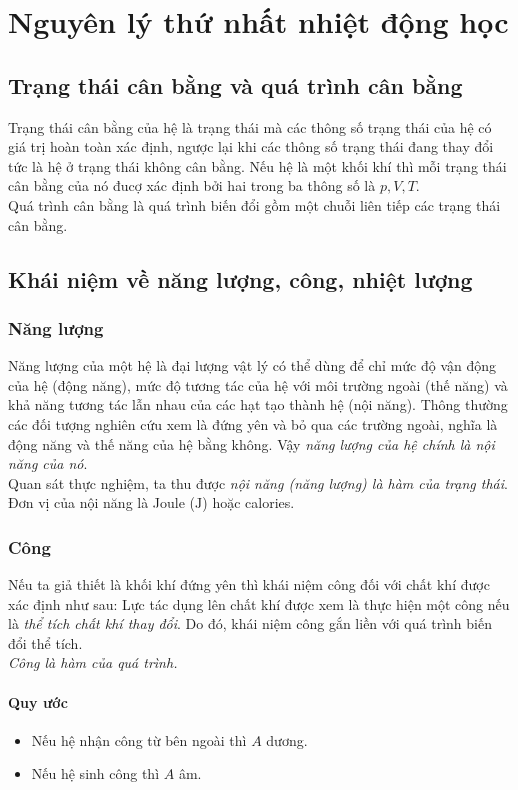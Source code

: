 \chapter{Nguyên lý thứ nhất nhiệt động học}
\section{Trạng thái cân bằng và quá trình cân bằng}
Trạng thái cân bằng của hệ là trạng thái mà các thông số trạng thái của hệ có giá trị hoàn toàn xác định, ngược lại khi các thông số trạng thái đang thay đổi tức là hệ ở trạng thái không cân bằng. Nếu hệ là một khối khí thì mỗi trạng thái cân bằng của nó đucợ xác định bởi hai trong ba thông số là $p, V, T.$\\
Quá trình cân bằng là quá trình biến đổi gồm một chuỗi liên tiếp các trạng thái cân bằng.
\section{Khái niệm về năng lượng, công, nhiệt lượng}
\subsection{Năng lượng}
Năng lượng của một hệ là đại lượng vật lý có thể dùng để chỉ mức độ vận động của hệ (động năng), mức độ tương tác của hệ với môi trường ngoài (thế năng) và khả năng tương tác lẫn nhau của các hạt tạo thành hệ (nội năng). Thông thường các đối tượng nghiên cứu xem là đứng yên và bỏ qua các trường ngoài, nghĩa là động năng và thế năng của hệ bằng không. Vậy \textit{năng lượng của hệ chính là nội năng của nó}.\\
Quan sát thực nghiệm, ta thu được \textit{nội năng (năng lượng) là hàm của trạng thái}.
Đơn vị của nội năng là Joule ($\mathrm{J}$) hoặc calories. 
\subsection{Công}
Nếu ta giả thiết là khối khí đứng yên thì khái niệm công đối với chất khí được xác định như sau: Lực tác dụng lên chất khí được xem là thực hiện một công nếu là \textit{thể tích chất khí thay đổi}. Do đó, khái niệm công gắn liền với quá trình biến đổi thể tích.\\
\textit{Công là hàm của quá trình.}
\subsubsection{Quy ước}
\begin{itemize}
\item Nếu hệ nhận công từ bên ngoài thì $A$ dương.
\item Nếu hệ sinh công thì $A$ âm.
\end{itemize}
